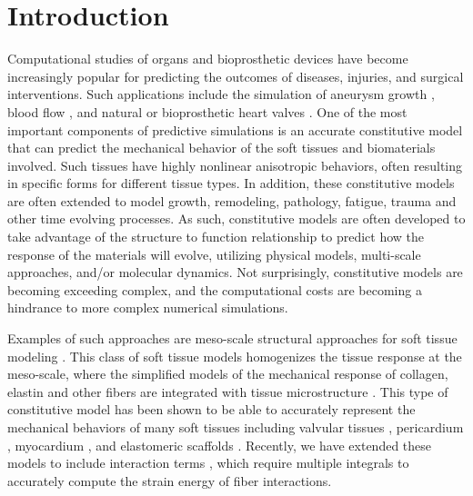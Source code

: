 
\section{Introduction}

	Computational studies of organs and bioprosthetic devices have become increasingly popular for predicting the outcomes of diseases, injuries, and surgical interventions. Such applications include the simulation of aneurysm growth \cite{rissland_abdominal_2009,ramault_comparison_2010,hoi_effects_2004,volokh_model_2008}, blood flow \cite{olufsen_numerical_2000,perktold_computer_1995,pries_blood_1990,oshima_finite_2001,bagchi_mesoscale_2007}, and natural or bioprosthetic heart valves \cite{zakerzadeh_computational_2017, soares_biomechanical_2016, kamensky_immersogeometric_2015, aggarwal_vivo_2016, nobili_numerical_2008, cheng_three_2004}. One of the most important components of predictive simulations is an accurate constitutive model that can predict the mechanical behavior of the soft tissues and biomaterials involved. Such tissues have highly nonlinear anisotropic behaviors, often resulting in specific forms for different tissue types. In addition, these constitutive models are often extended to model growth, remodeling, pathology, fatigue, trauma and other time evolving processes. As such, constitutive models are often developed to take advantage of the structure to function relationship to predict how the response of the materials will evolve, utilizing physical models, multi-scale approaches, and/or molecular dynamics. Not surprisingly, constitutive models are becoming exceeding complex, and the computational costs are becoming a hindrance to more complex numerical simulations. 


    Examples of such approaches are meso-scale structural approaches for soft tissue modeling \cite{lanir_constitutive_1983}. This class of soft tissue models homogenizes the tissue response at the meso-scale, where the simplified models of the mechanical response of collagen, elastin and other fibers are integrated with tissue microstructure \cite{kassab_structure_2016}. This type of constitutive model has been shown to be able to accurately represent the mechanical behaviors of many soft tissues including valvular tissues \cite{zhang_meso_2016, rego_mitral_2016}, pericardium \cite{zhang_modeling_2017}, myocardium \cite{avazmohammadi_novel_2016}, and elastomeric scaffolds \cite{d.amore_large_2016}. Recently, we have extended these models to include interaction terms \cite{zhang_modeling_2017, avazmohammadi_novel_2016}, which require multiple integrals to accurately compute the strain energy of fiber interactions. 




